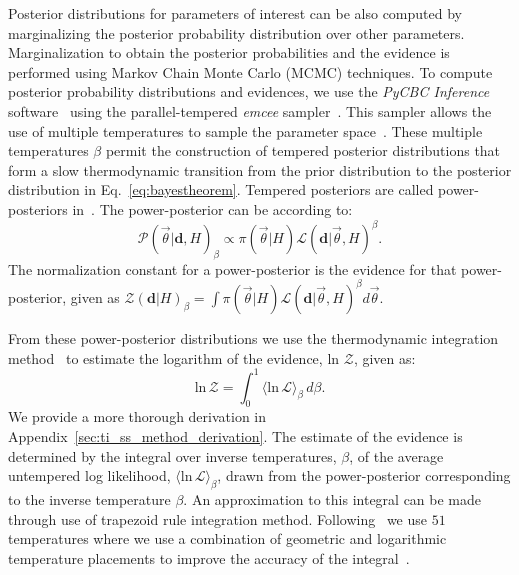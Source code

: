 Posterior distributions for parameters of interest can be also computed by marginalizing the posterior probability distribution over other parameters.  Marginalization to obtain the posterior probabilities and the evidence is performed using Markov Chain Monte Carlo (MCMC) techniques. To compute posterior probability distributions and evidences, we use the \emph{PyCBC Inference} software~\citep{alex_nitz_2018_1208115,biwer2019pycbc} using the parallel-tempered \emph{emcee} sampler~\citep{emcee,vousden:2016}.
This sampler allows the use of multiple temperatures to sample the parameter space~\citep{emcee, doi:10.1143/PTPS.157.317, B509983H}. These multiple temperatures $\beta$ permit the construction of tempered posterior distributions that form a slow thermodynamic transition from the prior distribution to the posterior distribution in Eq.~\ref{eq:bayestheorem}. Tempered posteriors are called power-posteriors in~\cite{lartillot2006computing, friel2008marginal}. The power-posterior can be according to:
\begin{equation}
    \mathcal{P}\left(\vec{\theta}|\mathbf{d}, H\right)_\beta \propto \pi\left(\vec{\theta} | H\right) \mathcal{L}\left(\mathbf{d} | \vec{\theta}, H\right)^\beta.
\end{equation}\label{eq:power_posterior}
The normalization constant for a power-posterior is the evidence for that power-posterior, given as $\mathcal{Z}(\mathbf{d}|H)_\beta = \int \pi\left(\vec{\theta} | H\right) \mathcal{L}\left(\mathbf{d} | \vec{\theta}, H\right)^\beta d\vec{\theta}$.

From these power-posterior distributions we use the thermodynamic integration method~\citep{lartillot2006computing,friel2008marginal} to estimate the logarithm of the evidence, ln $\mathcal{Z}$, given as:
\begin{equation}
\textrm{ln} \, \mathcal{Z} = \int_0^1 \langle \textrm{ln} \, \mathcal{L} \rangle_{\beta} \, d\beta.
\label{eq:thermoint}
\end{equation}
We provide a more thorough derivation in Appendix~\ref{sec:ti_ss_method_derivation}. The estimate of the evidence is determined by the integral over inverse temperatures, $\beta$, of the average untempered log likelihood, $\langle \textrm{ln}\, \mathcal{L} \rangle_{\beta}$, drawn from the power-posterior corresponding to the inverse temperature $\beta$. An approximation to this integral can be made through use of trapezoid rule integration method. Following~\cite{de2018tidal} we use $51$ temperatures where we use a combination of geometric and logarithmic temperature placements to improve the accuracy of the integral~\citep{liu2016evaluating}.

